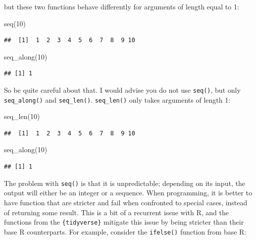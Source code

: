 \documentclass[
]{article}
\newenvironment{Shaded}{\begin{snugshade}}{\end{snugshade}}
\newcommand{\DecValTok}[1]{\textcolor[rgb]{0.00,0.00,0.81}{#1}}
\newcommand{\FunctionTok}[1]{\textcolor[rgb]{0.00,0.00,0.00}{#1}}
\newcommand{\NormalTok}[1]{#1}
\begin{document}
but these two functions behave differently for arguments of length equal to 1:

\begin{Shaded}
\begin{Highlighting}[]
\FunctionTok{seq}\NormalTok{(}\DecValTok{10}\NormalTok{)}
\end{Highlighting}
\end{Shaded}

\begin{verbatim}
##  [1]  1  2  3  4  5  6  7  8  9 10
\end{verbatim}

\begin{Shaded}
\begin{Highlighting}[]
\FunctionTok{seq\_along}\NormalTok{(}\DecValTok{10}\NormalTok{)}
\end{Highlighting}
\end{Shaded}

\begin{verbatim}
## [1] 1
\end{verbatim}

So be quite careful about that. I would advise you do not use \texttt{seq()}, but only \texttt{seq\_along()} and \texttt{seq\_len()}. \texttt{seq\_len()}
only takes arguments of length 1:

\begin{Shaded}
\begin{Highlighting}[]
\FunctionTok{seq\_len}\NormalTok{(}\DecValTok{10}\NormalTok{)}
\end{Highlighting}
\end{Shaded}

\begin{verbatim}
##  [1]  1  2  3  4  5  6  7  8  9 10
\end{verbatim}

\begin{Shaded}
\begin{Highlighting}[]
\FunctionTok{seq\_along}\NormalTok{(}\DecValTok{10}\NormalTok{)}
\end{Highlighting}
\end{Shaded}

\begin{verbatim}
## [1] 1
\end{verbatim}

The problem with \texttt{seq()} is that it is unpredictable; depending on its input, the output will either be an integer or a sequence.
When programming, it is better to have function that are stricter and fail when confronted to special cases, instead of returning
some result. This is a bit of a recurrent issue with R, and the functions from the \texttt{\{tidyverse\}} mitigate this issue by being
stricter than their base R counterparts. For example, consider the \texttt{ifelse()} function from base R:
\end{document}
